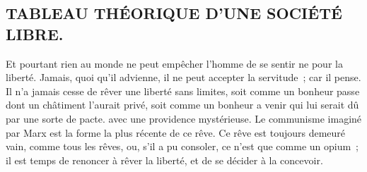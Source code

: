 \documentclass[french,twoside]{book} %
\begin{document}
\subsection[{TABLEAU THÉORIQUE D’UNE SOCIÉTÉ LIBRE.}]{TABLEAU THÉORIQUE D’UNE SOCIÉTÉ LIBRE.}
\noindent Et pourtant rien au monde ne peut empêcher l'homme de se sentir ne pour la liberté. Jamais, quoi qu'il advienne, il ne peut accepter la servitude ; car il pense. Il n'a jamais cesse de rêver une liberté sans limites, soit comme un bonheur passe dont un châtiment l'aurait privé, soit comme un bonheur a venir qui lui serait dû par une sorte de pacte. avec une providence mystérieuse. Le communisme imaginé par Marx est la forme la plus récente de ce rêve. Ce rêve est toujours demeuré vain, comme tous les rêves, ou, s'il a pu consoler, ce n'est que comme un opium ; il est temps de renoncer à rêver la liberté, et de se décider à la concevoir.\par
\end{document}
